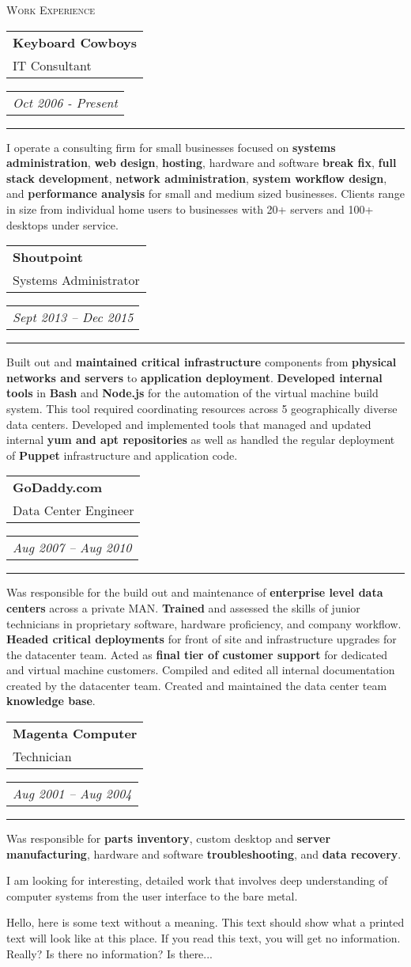 \documentclass{article}
\makeatletter
\newcommand{\job}[3]{
\bigskip
\noindent\begin{tabular}[t]{@{}l} 
    \textbf{#1} \\ #2
\end{tabular}
\hfill
\begin{tabular}[t]{l@{}}
    \\
    \textit{#3}
\end{tabular}
\noindent\rule{\columnwidth}{0.5pt}
}
\makeatother
\begin{document}
\begin{multicols}{2}

{\raggedleft
    \large{\textsc{\color{PineGreen}Work Experience}}\par
}

\job{Keyboard Cowboys}{IT Consultant}{Oct 2006 - Present}
I operate a consulting firm for small businesses focused on \textbf{systems administration}, \textbf{web design}, \textbf{hosting}, hardware and software \textbf{break fix}, \textbf{full stack development}, \textbf{network administration}, \textbf{system workflow design}, and \textbf{performance analysis} for small and medium sized businesses. Clients range in size from individual home users to businesses with 20+ servers and 100+ desktops under service.

\job{Shoutpoint}{Systems Administrator}{Sept 2013 -- Dec 2015}
Built out and \textbf{maintained critical infrastructure} components from \textbf{physical networks and servers} to \textbf{application deployment}. \textbf{Developed internal tools} in \textbf{Bash} and \textbf{Node.js} for the automation of the virtual machine build system. This tool required coordinating resources across 5 geographically diverse data centers. Developed and implemented tools that managed and updated internal \textbf{yum and apt repositories} as well as handled the regular deployment of \textbf{Puppet} infrastructure and application code.

\job{GoDaddy.com}{Data Center Engineer}{Aug 2007 -- Aug 2010}
Was responsible for the build out and maintenance of \textbf{enterprise level data centers} across a private MAN. \textbf{Trained} and assessed the skills of junior technicians in proprietary software, hardware proficiency, and company workflow. \textbf{Headed critical deployments} for front of site and infrastructure upgrades for the datacenter team. Acted as \textbf{final tier of customer support} for dedicated and virtual machine customers. Compiled and edited all internal documentation created by the datacenter team. Created and maintained the data center team \textbf{knowledge base}.

\job{Magenta Computer}{Technician}{Aug 2001 -- Aug 2004}
Was responsible for \textbf{parts inventory}, custom desktop and \textbf{server manufacturing}, hardware and software \textbf{troubleshooting}, and \textbf{data recovery}.

\columnbreak

I am looking for interesting, detailed work that involves deep understanding of computer systems from the user interface to the bare metal. 

\bigskip

Hello, here is some text without a meaning.  This text should show what 
a printed text will look like at this place. If you read this text, you will get no information.  Really?  Is there no information?  Is there... 
\end{multicols}
 
\end{document}
